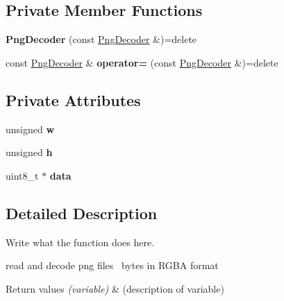 \subsection*{Private Member Functions}
\begin{DoxyCompactItemize}
\item 
\hypertarget{classPngDecoder_a593683f3ab43f058ad6623bf9a0cc101}{{\bfseries Png\+Decoder} (const \hyperlink{classPngDecoder}{Png\+Decoder} \&)=delete}\label{classPngDecoder_a593683f3ab43f058ad6623bf9a0cc101}

\item 
\hypertarget{classPngDecoder_a930e1427fb5ad61dca776f458ca99b06}{const \hyperlink{classPngDecoder}{Png\+Decoder} \& {\bfseries operator=} (const \hyperlink{classPngDecoder}{Png\+Decoder} \&)=delete}\label{classPngDecoder_a930e1427fb5ad61dca776f458ca99b06}

\end{DoxyCompactItemize}
\subsection*{Private Attributes}
\begin{DoxyCompactItemize}
\item 
\hypertarget{classPngDecoder_a40f09e2097962ab0c9788a7cf61eacd0}{unsigned {\bfseries w}}\label{classPngDecoder_a40f09e2097962ab0c9788a7cf61eacd0}

\item 
\hypertarget{classPngDecoder_a20aa858e65cb8af05c781f7f4e3a2f50}{unsigned {\bfseries h}}\label{classPngDecoder_a20aa858e65cb8af05c781f7f4e3a2f50}

\item 
\hypertarget{classPngDecoder_a23272dbc35d902b9c2aed79cf9ed40a6}{uint8\+\_\+t $\ast$ {\bfseries data}}\label{classPngDecoder_a23272dbc35d902b9c2aed79cf9ed40a6}

\end{DoxyCompactItemize}


\subsection{Detailed Description}
Write what the function does here. 

read and decode png files~\newline
 bytes in R\+G\+B\+A format 
\begin{DoxyRetVals}{Return values}
{\em (variable)} & (description of variable) \\
\hline
\end{DoxyRetVals}


